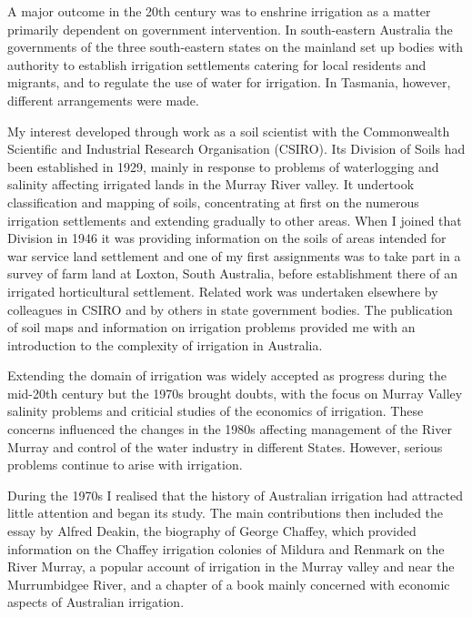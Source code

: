 A major outcome in the 20th century was to enshrine irrigation as a
matter primarily dependent on government intervention.  In
south-eastern Australia the governments of the three south-eastern
states on the mainland set up bodies with authority to establish
irrigation settlements catering for local residents and migrants, and
to regulate the use of water for irrigation.  In Tasmania, however,
different arrangements were made.

My interest developed through work as a soil scientist with the
Commonwealth Scientific and Industrial Research Organisation
(CSIRO). Its Division of Soils had been established in 1929, mainly in
response to problems of waterlogging and salinity affecting irrigated
lands in the Murray River valley.  It undertook classification and
mapping of soils, concentrating at first on the numerous irrigation
settlements and extending gradually to other areas.  When I joined
that Division in 1946 it was providing information on the soils of
areas intended for war service land settlement and one of my first
assignments was to take part in a survey of farm land at Loxton, South
Australia, before establishment there of an irrigated horticultural
settlement.  Related work was undertaken elsewhere by colleagues in
CSIRO and by others in state government bodies.  The publication of
soil maps and information on irrigation problems provided me with an
introduction to the complexity of irrigation in Australia.

Extending the domain of irrigation was widely accepted as progress
during the mid-20th century but the 1970s brought doubts, with the
focus on Murray Valley salinity problems and criticial studies of the
economics of irrigation.  These concerns influenced the changes in the
1980s affecting management of the River Murray and control of the
water industry in different States.  However, serious problems
continue to arise with irrigation.

During the 1970s I realised that the history of Australian irrigation
had attracted little attention and began its study.  The main
contributions then included the essay by Alfred Deakin, the biography
of George Chaffey, which provided information on the Chaffey
irrigation colonies of Mildura and Renmark on the River Murray, a
popular account of irrigation in the Murray valley and near the
Murrumbidgee River, and a chapter of a book mainly concerned with
economic aspects of Australian irrigation.

